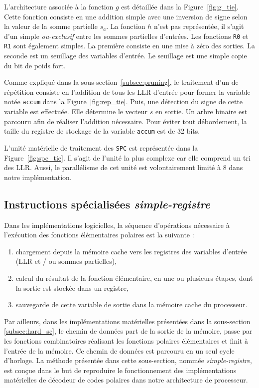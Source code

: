 L'architecture associée à la fonction $g$ est détaillée dans la Figure~\ref{fig:g_tie}. Cette fonction consiste en une addition simple avec une inversion de signe selon la valeur de la somme partielle $s_a$.
La fonction $h$ n'est pas représentée, il s'agit d'un simple \textit{ou-exclusif} entre les sommes partielles d'entrées. Les fonctions \texttt{R0} et \texttt{R1} sont également simples. La première consiste en une mise à zéro des sorties. La seconde est un seuillage des variables d'entrée. Le seuillage est une simple copie du bit de poids fort.

Comme expliqué dans la sous-section~\ref{subsec:pruning}, le traitement d'un \noeud de répétition consiste en l'addition de tous les LLR d'entrée pour former la variable notée \og \texttt{accum} \fg dans la Figure~\ref{fig:rep_tie}. Puis, une détection du signe de cette variable est effectuée. Elle détermine le vecteur $s$ en sortie. Un arbre binaire est parcouru afin de réaliser l'addition nécessaire. Pour éviter tout débordement, la taille du registre de stockage de la variable \texttt{accum} est de 32 bits.

L'unité matérielle de traitement des \noeuds \texttt{SPC} est représentée dans la Figure~\ref{fig:spc_tie}. Il s'agit de l'unité la plus complexe car elle comprend un tri des LLR. Aussi, le parallélisme de cet unité est volontairement limité à 8 dans notre implémentation.

\subsection{Instructions spécialisées \textit{simple-registre}}

Dans les implémentations logicielles, la séquence d'opérations nécessaire à l'exécution des fonctions élémentaires polaires est la suivante :
\begin{enumerate}[label=(\roman*)]
  \item chargement depuis la mémoire cache vers les registres des variables d'entrée (LLR et / ou sommes partielles),
  \item calcul du résultat de la fonction élémentaire, en une ou plusieurs étapes, dont la sortie est stockée dans un registre,
  \item sauvegarde de cette variable de sortie dans la mémoire cache du processeur.
\end{enumerate}

Par ailleurs, dans les implémentations matérielles présentées dans la sous-section \ref{subsec:hard_sc}, le chemin de données part de la sortie de la mémoire, passe par les fonctions combinatoires réalisant les fonctions polaires élémentaires et finit à l'entrée de la mémoire. Ce chemin de données est parcouru en un seul cycle d'horloge. La méthode présentée dans cette sous-section, nommée \textit{simple-registre}, est conçue dans le but de reproduire le fonctionnement des implémentations matérielles de décodeur de codes polaires dans notre architecture de processeur.

